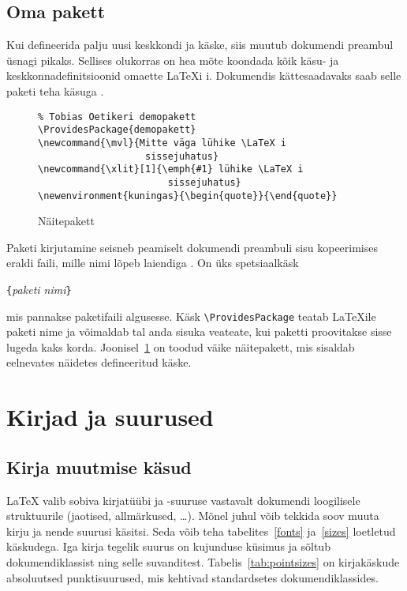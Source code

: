 \subsection{Oma pakett}

Kui defineerida palju uusi keskkondi ja käske, siis muutub dokumendi
preambul üsnagi pikaks. Sellises olukorras on hea mõte koondada kõik
käsu- ja keskkonnadefinitsioonid omaette \LaTeX i i. Dokumendis
kättesaadavaks saab selle paketi teha käsuga .

\begin{figure}[!htbp]
\begin{lined}{\textwidth}
\begin{verbatim}
% Tobias Oetikeri demopakett
\ProvidesPackage{demopakett}
\newcommand{\mvl}{Mitte väga lühike \LaTeX i
                   sissejuhatus}
\newcommand{\xlit}[1]{\emph{#1} lühike \LaTeX i
                       sissejuhatus}
\newenvironment{kuningas}{\begin{quote}}{\end{quote}}
\end{verbatim}
\end{lined}
\caption{Näitepakett} \label{package}
\end{figure}

Paketi kirjutamine seisneb peamiselt dokumendi preambuli sisu
kopeerimises eraldi faili, mille nimi lõpeb laiendiga . On
üks spetsiaalkäsk%
\begin{lscommand}
\verb|{|\emph{paketi nimi}\verb|}|
\end{lscommand}
\noindent mis pannakse paketifaili algusesse. Käsk
\verb|\ProvidesPackage| teatab \LaTeX ile paketi nime ja võimaldab tal
anda sisuka veateate, kui paketti proovitakse sisse lugeda kaks korda.
Joonisel~\ref{package} on toodud väike näitepakett, mis sisaldab
eelnevates näidetes defineeritud käske.

\section{Kirjad ja suurused}
\label{sec:fontsize}

\subsection{Kirja muutmise käsud}
 \LaTeX{} valib sobiva kirjatüübi ja
-suuruse vastavalt dokumendi loogilisele struktuurile (jaotised,
allmärkused, \ldots). Mõnel juhul võib tekkida soov muuta kirju ja
nende suurusi käsitsi. Seda võib teha tabelites~\ref{fonts}
ja~\ref{sizes} loetletud käskudega. Iga kirja tegelik suurus on
kujunduse küsimus ja sõltub dokumendiklassist ning selle suvanditest.
Tabelis~\ref{tab:pointsizes} on kirjakäskude absoluutsed
punktisuurused, mis kehtivad standardsetes dokumendiklassides.

